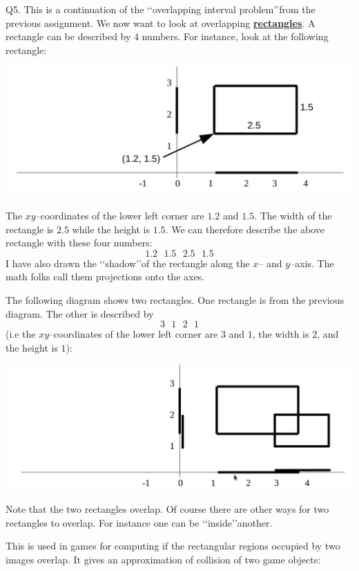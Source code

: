 Q5. This is a continuation of the \lq\lq overlapping interval problem\rq\rq from 
the previous assignment. We now want to look at overlapping
{\bf \underline{rectangles}}. A rectangle can be described by $4$ numbers.
For instance, look at the following rectangle:

\includegraphics[width=6 in, height=2 in]{a06q05/question/figure1.png}

The $xy$--coordinates of the lower left corner are $1.2$ and $1.5$. The width 
of the rectangle is $2.5$ while the height is $1.5$. We can therefore describe
the above rectangle with these four numbers:
\[ 1.2 \,\,\,\, 1.5 \,\,\,\, 2.5 \,\,\,\, 1.5 \]
I have also drawn the \lq\lq shadow\rq\rq of the rectangle along the $x$-- and
$y$--axis. The math folks call them projections onto the axes.

The following diagram shows two rectangles. One rectangle is from the previous 
diagram. The other is described by
\[ 3 \,\,\,\, 1 \,\,\,\, 2 \,\,\,\, 1 \]
(i.e the $xy$--coordinates 
of the lower left corner are $3$ and $1$, the width is $2$, 
and the height is $1$):

\includegraphics[width=6 in, height=2 in]{a06q05/question/figure2.png}

Note that the two rectangles overlap. Of course there are other ways for two 
rectangles to overlap. For instance one can be \lq\lq inside\rq\rq another.

This is used in games for computing if the rectangular regions occupied by two 
images overlap. It gives an approximation of collision of two game objects:

